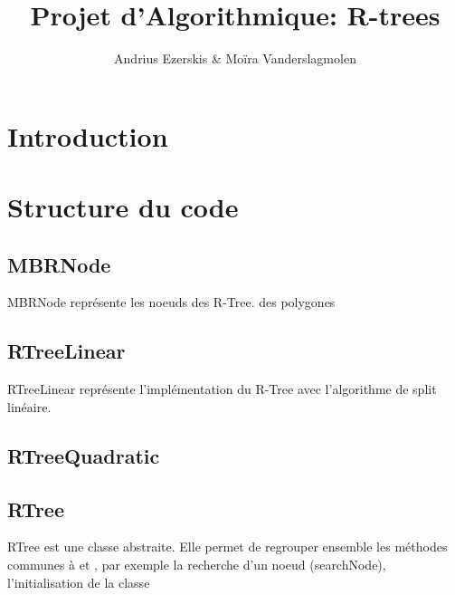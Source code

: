 \documentclass[utf8]{article}
\begin{document}
\begin{titlepage}


\author{Andrius Ezerskis \& Moïra Vanderslagmolen}
\title{Projet d'Algorithmique: R-trees}

\maketitle
\end{titlepage}
\tableofcontents
\newpage
\begin{large}



\section{Introduction}
\indent
\par


\par

\section{Structure du code}

\par
\subsection{MBRNode}
MBRNode représente les noeuds des R-Tree. des polygones

\subsection{RTreeLinear}
\label{RTreeLinear}

RTreeLinear représente l'implémentation du R-Tree avec l'algorithme de split linéaire.

\subsection{RTreeQuadratic}
\label{RTreeQuadratic}

\subsection{RTree}

RTree est une classe abstraite. Elle permet de regrouper ensemble les méthodes
communes à  et , par exemple la
recherche d'un noeud (searchNode), l'initialisation de la classe



\end{large}
\end{document}
